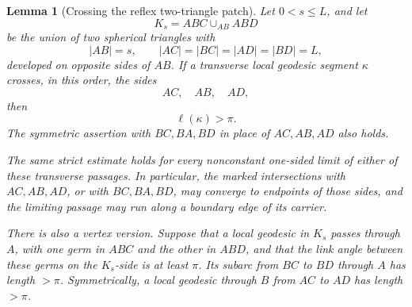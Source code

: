 \documentclass[10pt,a4paper]{amsart}
\newtheorem{lemma}{Lemma}
\begin{document}
\begin{lemma}[Crossing the reflex two-triangle patch]
\label{lem:reflex-patch-crossing}
Let \(0<s\le L\), and let
\[
        K_s=ABC\cup_{AB}ABD
\]
be the union of two spherical triangles with
\[
 |AB|=s,\qquad |AC|=|BC|=|AD|=|BD|=L,
\]
developed on opposite sides of \(AB\).  If a transverse local geodesic segment
\(\kappa\) crosses, in this order, the sides
\[
        AC,\quad AB,\quad AD,
\]
then
\[
        \ell(\kappa)>\pi.
\]
The symmetric assertion with \(BC,BA,BD\) in place of \(AC,AB,AD\) also
holds.

The same strict estimate holds for every nonconstant one-sided limit of either
of these transverse passages.  In particular, the marked intersections with
\(AC,AB,AD\), or with \(BC,BA,BD\), may converge to endpoints of those sides,
and the limiting passage may run along a boundary edge of its carrier.

There is also a vertex version. Suppose that a local geodesic in \(K_s\)
passes through \(A\), with one germ in \(ABC\) and the other in \(ABD\), and
that the link angle between these germs on the \(K_s\)-side is at least
\(\pi\). Its
subarc from \(BC\) to \(BD\) through \(A\) has length \(>\pi\).
Symmetrically, a local geodesic through \(B\) from \(AC\) to \(AD\) has
length \(>\pi\).
\end{lemma}
\end{document}

